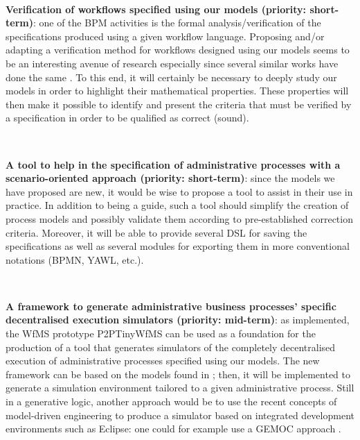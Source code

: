 ~

\noindent\textbf{Verification of workflows specified using our models (priority: short-term)}: one of the BPM activities is the formal analysis/verification of the specifications produced using a given workflow language. Proposing and/or adapting a verification method for workflows designed using our models seems to be an interesting avenue of research especially since several similar works have done the same \cite{badouel2015active, van1997verification, van2000workflow}. To this end, it will certainly be necessary to deeply study our models in order to highlight their mathematical properties. These properties will then make it possible to identify and present the criteria that must be verified by a specification in order to be qualified as correct (sound).




~

\noindent\textbf{A tool to help in the specification of administrative processes with a scenario-oriented approach (priority: short-term)}: since the models we have proposed are new, it would be wise to propose a tool to assist in their use in practice. In addition to being a guide, such a tool should simplify the creation of process models and possibly validate them according to pre-established correction criteria. Moreover, it will be able to provide several DSL for saving the specifications as well as several modules for exporting them in more conventional notations (BPMN, YAWL, etc.).




~

\noindent\textbf{A framework to generate administrative business processes' specific decentralised execution simulators (priority: mid-term)}: as implemented, the WfMS prototype P2PTinyWfMS can be used as a foundation for the production of a tool that generates simulators of the completely decentralised execution of administrative processes specified using our models. The new framework can be based on the models found in \cite{tchembe2019ad}; then, it will be implemented to generate a simulation environment tailored to a given administrative process. Still in a generative logic, another approach would be to use the recent concepts of model-driven engineering to produce a simulator based on integrated development environments such as Eclipse: one could for example use a GEMOC approach \cite{bousse2016execution, combemale2017language}.



~


